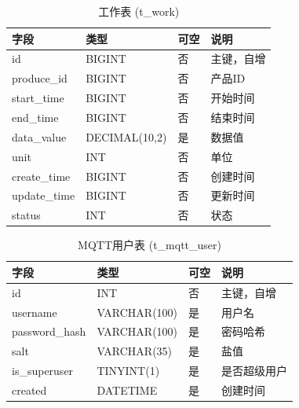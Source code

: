 \documentclass{xduugmr}
\begin{document}
\begin{table}[H]
    \centering
    \caption{工作表 (t\_work)}
    \begin{tabular}{|l|l|l|l|}
        \hline
        \textbf{字段} & \textbf{类型} & \textbf{可空} & \textbf{说明} \\
        \hline
        id & BIGINT & 否 & 主键，自增 \\
        produce\_id & BIGINT & 否 & 产品ID \\
        start\_time & BIGINT & 否 & 开始时间 \\
        end\_time & BIGINT & 否 & 结束时间 \\
        data\_value & DECIMAL(10,2) & 是 & 数据值 \\
        unit & INT & 否 & 单位 \\
        create\_time & BIGINT & 否 & 创建时间 \\
        update\_time & BIGINT & 否 & 更新时间 \\
        status & INT & 否 & 状态 \\
        \hline
    \end{tabular}
\end{table}

\begin{table}[H]
    \centering
    \caption{MQTT用户表 (t\_mqtt\_user)}
    \begin{tabular}{|l|l|l|l|}
        \hline
        \textbf{字段} & \textbf{类型} & \textbf{可空} & \textbf{说明} \\
        \hline
        id & INT & 否 & 主键，自增 \\
        username & VARCHAR(100) & 是 & 用户名 \\
        password\_hash & VARCHAR(100) & 是 & 密码哈希 \\
        salt & VARCHAR(35) & 是 & 盐值 \\
        is\_superuser & TINYINT(1) & 是 & 是否超级用户 \\
        created & DATETIME & 是 & 创建时间 \\
        \hline
    \end{tabular}
\end{table}
\end{document}
